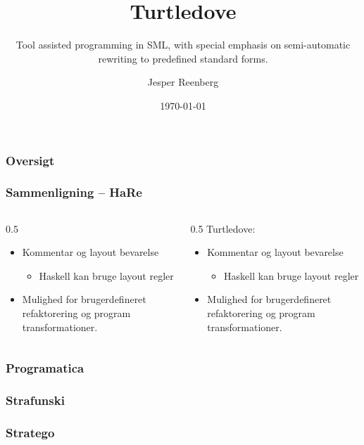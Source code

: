 \documentclass[slidestop,compress,mathserif, xcolor=table]{beamer}
\title[]{Turtledove}
\subtitle{\tiny{Tool assisted programming in SML, with special emphasis on
    semi-automatic\\ rewriting to predefined standard forms.}}
\author{Jesper Reenberg}
\institute[DIKU]{Department of Computer Science}
\date[]{\today}
\begin{document}
\frame[plain]{\titlepage}

\begin{frame}[c]
  \frametitle{Oversigt}  


\end{frame}

\begin{frame}[c]
  \frametitle{Sammenligning -- HaRe}  

  \begin{columns}
    
    \begin{column}{0.5\textwidth{}}
      \begin{itemize}
      \item Kommentar og layout bevarelse 
        \begin{itemize}
        \item Haskell kan bruge layout regler
        \end{itemize}    
      \item Mulighed for brugerdefineret refaktorering og program transformationer.      
      \end{itemize}      
    \end{column}
    \begin{column}{0.5\textwidth{}}
      Turtledove:
      \begin{itemize}
      \item Kommentar og layout bevarelse 
        \begin{itemize}
        \item Haskell kan bruge layout regler
        \end{itemize}    
      \item Mulighed for brugerdefineret refaktorering og program transformationer.      
      \end{itemize}      
    \end{column}
  \end{columns}

\end{frame}

\begin{frame}[c]
  \frametitle{Programatica}  


\end{frame}

\begin{frame}[c]
  \frametitle{Strafunski}


\end{frame}


\begin{frame}[c]
  \frametitle{Stratego}


\end{frame}
\end{document}

